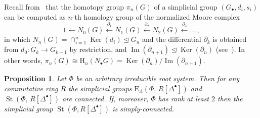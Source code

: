 \documentclass[oneside, 11pt]{amsart}
\numberwithin{equation}{section}
\newtheorem{proposition}[lemma]{Proposition}
\renewcommand{\Im}{\mathop{\mathrm{Im}}\nolimits}
\newcommand{\Ker}{\mathop{\mathrm{Ker}}\nolimits}
\newcommand{\St}{\mathop{\mathrm{St}}\nolimits}
\newcommand{\E}{\mathrm{E}}
\theoremstyle{definition}
\theoremstyle{definition}
\theoremstyle{remark}
\begin{document}
Recall from~\cite[\S~17]{May67} that the homotopy group $\pi_n(G)$ of a simplicial group $(G_\bullet, d_i, s_i)$ can be computed as $n$-th homology group of the normalized Moore complex
\[ 1 \leftarrow N_0(G) \xleftarrow{\partial_1} N_1(G) \xleftarrow{\partial_2} N_2(G) \xleftarrow{\partial_3} \ldots\,, \]
in which $N_n(G) = \cap_{i=1}^n\Ker(d_i) \trianglelefteq G_n$ and the differential $\partial_k$ is obtained from $d_0\colon G_k \to G_{k-1}$ by restriction, and $\Im(\partial_{n+1})\trianglelefteq\Ker(\partial_n)$ (see~\cite[Propositions~17.3--17.4]{May67}). In other words, $\pi_n(G) \cong \mathrm{H}_n(N_\bullet G) = \Ker(\partial_n) / \Im(\partial_{n+1})$.

\begin{proposition}\label{prop:pi1-StDelta} Let $\Phi$ be an arbitrary irreducible root system. Then for any commutative ring $R$ the simplicial groups $\E_\Lambda(\Phi,\,R[\Delta^\bullet])$ and $\St(\Phi,\,R[\Delta^\bullet])$ are connected. If, moreover, $\Phi$ has rank at least $2$ then the simplicial group $\St(\Phi, R[\Delta^\bullet])$ is simply-connected. \end{proposition}
\end{document}
